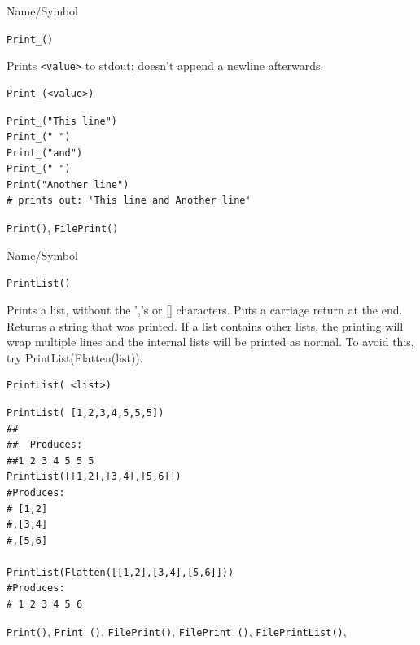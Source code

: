 \begin{desc}{Name/Symbol}
\item[Name/Symbol]	\verb+Print_()+

\item[Description]	Prints \verb+<value>+ to stdout; doesn't append a newline afterwards.

\item[Usage]		
\begin{verbatim}
Print_(<value>)
\end{verbatim}

\item[Example]	
\begin{verbatim}
Print_("This line")
Print_(" ")
Print_("and")
Print_(" ")
Print("Another line")
# prints out: 'This line and Another line'
\end{verbatim}

\item[See Also]	\verb+Print()+, \verb+FilePrint()+
\end{desc}


\begin{desc}{Name/Symbol}
\item[Name/Symbol]	\verb+PrintList()+

\item[Description]	Prints a list, without the ','s or []
  characters. Puts a carriage return at the end.  Returns a string
  that was printed.  If a list contains other lists, the printing will
  wrap multiple lines and the internal lists will be printed as
  normal.  To avoid this, try PrintList(Flatten(list)).

\item[Usage]
\begin{verbatim}
PrintList( <list>)
\end{verbatim}

\item[Example]
\begin{verbatim}
PrintList( [1,2,3,4,5,5,5])
##
##  Produces:
##1 2 3 4 5 5 5
PrintList([[1,2],[3,4],[5,6]])
#Produces:
# [1,2]
#,[3,4]
#,[5,6]

PrintList(Flatten([[1,2],[3,4],[5,6]]))
#Produces:
# 1 2 3 4 5 6

\end{verbatim}

\item[See Also]	\verb+Print()+, \verb+Print_()+, \verb+FilePrint()+, \verb+FilePrint_()+, \verb+FilePrintList()+,
\end{desc}

